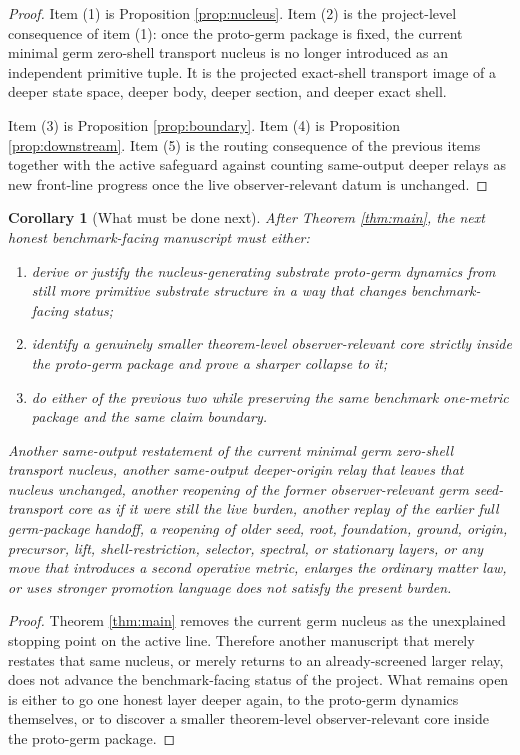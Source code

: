 \documentclass[11pt]{article}
\newtheorem{corollary}{Corollary}
\begin{document}
\begin{proof}
Item (1) is Proposition \ref{prop:nucleus}. Item (2) is the project-level consequence of item (1): once the proto-germ package is fixed, the current minimal germ zero-shell transport nucleus is no longer introduced as an independent primitive tuple. It is the projected exact-shell transport image of a deeper state space, deeper body, deeper section, and deeper exact shell.

Item (3) is Proposition \ref{prop:boundary}. Item (4) is Proposition \ref{prop:downstream}. Item (5) is the routing consequence of the previous items together with the active safeguard against counting same-output deeper relays as new front-line progress once the live observer-relevant datum is unchanged.
\end{proof}

\begin{corollary}[What must be done next]
\label{cor:next}
After Theorem \ref{thm:main}, the next honest benchmark-facing manuscript must either:
\begin{enumerate}
    \item derive or justify the nucleus-generating substrate proto-germ dynamics from still more primitive substrate structure in a way that changes benchmark-facing status;
    \item identify a genuinely smaller theorem-level observer-relevant core strictly inside the proto-germ package and prove a sharper collapse to it;
    \item do either of the previous two while preserving the same benchmark one-metric package and the same claim boundary.
\end{enumerate}
Another same-output restatement of the current minimal germ zero-shell transport nucleus, another same-output deeper-origin relay that leaves that nucleus unchanged, another reopening of the former observer-relevant germ seed-transport core as if it were still the live burden, another replay of the earlier full germ-package handoff, a reopening of older seed, root, foundation, ground, origin, precursor, lift, shell-restriction, selector, spectral, or stationary layers, or any move that introduces a second operative metric, enlarges the ordinary matter law, or uses stronger promotion language does not satisfy the present burden.
\end{corollary}

\begin{proof}
Theorem \ref{thm:main} removes the current germ nucleus as the unexplained stopping point on the active line. Therefore another manuscript that merely restates that same nucleus, or merely returns to an already-screened larger relay, does not advance the benchmark-facing status of the project. What remains open is either to go one honest layer deeper again, to the proto-germ dynamics themselves, or to discover a smaller theorem-level observer-relevant core inside the proto-germ package.
\end{proof}
\end{document}
